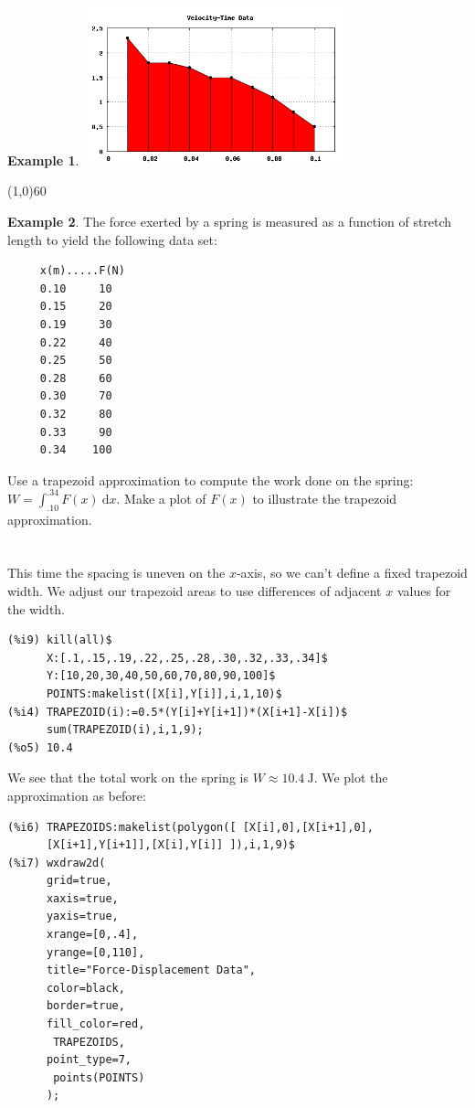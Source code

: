 \documentclass[10.5pt,twoside]{report}
\theoremstyle{definition}
\newtheorem{exmp}{Example}[section]
\begin{document}
\begin{exmp}
\includegraphics[width=3in]{example_2_2_2_1}

\end{exmp}

\line(1,0){60}
\linethickness{0.5mm}
${}$\\
\begin{exmp} The force exerted by a spring is measured as a function of stretch length to yield the following data set:\\

\begin{verbatim}
     x(m).....F(N)
     0.10     10
     0.15     20
     0.19     30
     0.22     40
     0.25     50
     0.28     60
     0.30     70
     0.32     80
     0.33     90
     0.34    100
\end{verbatim}

Use a trapezoid approximation to compute the work done on the spring:  $W=\displaystyle \int_{.10}^{.34} F(x)\ \mathrm{d}x$.  Make a plot of $F(x)$ to illustrate the trapezoid approximation.\\
${}$\\
${}$\\
This time the spacing is uneven on the $x$-axis, so we can't define a fixed trapezoid width.  We adjust our trapezoid areas to use differences of adjacent $x$ values for the width.

\begin{verbatim}
(%i9) kill(all)$
      X:[.1,.15,.19,.22,.25,.28,.30,.32,.33,.34]$
      Y:[10,20,30,40,50,60,70,80,90,100]$
      POINTS:makelist([X[i],Y[i]],i,1,10)$
(%i4) TRAPEZOID(i):=0.5*(Y[i]+Y[i+1])*(X[i+1]-X[i])$
      sum(TRAPEZOID(i),i,1,9);
(%o5) 10.4
\end{verbatim} 

We see that the total work on the spring is $W \approx 10.4\ \mathrm{J}$.  We plot the approximation as before:\\

\begin{verbatim}
(%i6) TRAPEZOIDS:makelist(polygon([ [X[i],0],[X[i+1],0],
      [X[i+1],Y[i+1]],[X[i],Y[i]] ]),i,1,9)$
(%i7) wxdraw2d(
      grid=true,
      xaxis=true,
      yaxis=true,
      xrange=[0,.4],
      yrange=[0,110],
      title="Force-Displacement Data",
      color=black,
      border=true,
      fill_color=red,
       TRAPEZOIDS,
      point_type=7,
       points(POINTS)
      );
\end{verbatim}



\end{exmp}
\end{document}
